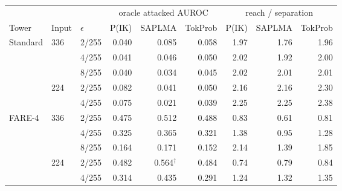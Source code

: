 \footnotesize
\setlength{\tabcolsep}{5pt}
\begin{tabular}{@{}lll rrr rrr@{}}
\toprule
 &  &  & \multicolumn{3}{c}{oracle attacked AUROC} & \multicolumn{3}{c}{reach / separation} \\
\cmidrule(lr){4-6}\cmidrule(lr){7-9}
Tower & Input & $\epsilon$ & P(IK) & SAPLMA & TokProb & P(IK) & SAPLMA & TokProb \\
\midrule
\multirow{5}{*}{Standard} & \multirow{3}{*}{336} & 2/255 & 0.040 & 0.085 & 0.058 & 1.97 & 1.76 & 1.96 \\
 &  & 4/255 & 0.041 & 0.046 & 0.050 & 2.02 & 1.92 & 2.00 \\
 &  & 8/255 & 0.040 & 0.034 & 0.045 & 2.02 & 2.01 & 2.01 \\
 & \multirow{2}{*}{224} & 2/255 & 0.082 & 0.041 & 0.050 & 2.16 & 2.16 & 2.30 \\
 &  & 4/255 & 0.075 & 0.021 & 0.039 & 2.25 & 2.25 & 2.38 \\
\midrule
\multirow{5}{*}{FARE-4} & \multirow{3}{*}{336} & 2/255 & 0.475 & 0.512 & 0.488 & 0.83 & 0.61 & 0.81 \\
 &  & 4/255 & 0.325 & 0.365 & 0.321 & 1.38 & 0.95 & 1.28 \\
 &  & 8/255 & 0.164 & 0.171 & 0.152 & 2.14 & 1.39 & 1.85 \\
 & \multirow{2}{*}{224} & 2/255 & 0.482 & 0.564$^{\dagger}$ & 0.484 & 0.74 & 0.79 & 0.84 \\
 &  & 4/255 & 0.314 & 0.435 & 0.291 & 1.24 & 1.32 & 1.35 \\
\bottomrule
\end{tabular}
